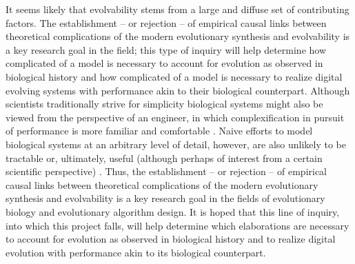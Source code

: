 It seems likely that evolvability stems from a large and diffuse set of contributing factors. The establishment -- or rejection -- of empirical causal links between theoretical complications of the modern evolutionary synthesis and evolvability is a key research goal in the field; this type of inquiry will help determine how complicated of a model is necessary to account for evolution as observed in biological history and how complicated of a model is necessary to realize digital evolving systems with performance akin to their biological counterpart. Although scientists traditionally strive for simplicity biological systems might also be viewed from the perspective of an engineer, in which complexification in pursuit of performance is more familiar and comfortable \cite[pg 6,7]{Sterling2015PrinciplesDesign}. Naive efforts to model biological systems at an arbitrary level of detail, however, are also unlikely to be tractable or, ultimately, useful (although perhaps of interest from a certain scientific perspective) \cite[pg 354]{Downing2015IntelligenceSystems}. Thus, the establishment -- or rejection -- of empirical causal links between theoretical complications of the modern evolutionary synthesis and evolvability is a key research goal in the fields of evolutionary biology and evolutionary algorithm design. It is hoped that this line of inquiry, into which this project falls, will help determine which elaborations are necessary to account for evolution as observed in biological history and to realize digital evolution with performance akin to its biological counterpart.